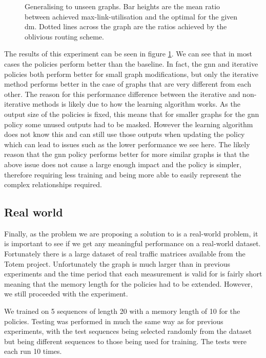 \begin{figure}
    \centering
    
    \caption{Generalising to unseen graphs. Bar heights are the mean ratio between achieved max-link-utilisation and the optimal for the given \ac{dm}. Dotted lines across the graph are the ratios achieved by the oblivious routing scheme.}
    \label{fig:exp_graphs}
\end{figure}

The results of this experiment can be seen in figure \ref{fig:exp_graphs}. We can see that in most cases the policies perform better than the baseline. In fact, the \ac{gnn} and iterative policies both perform better for small graph modifications, but only the iterative method performs better in the case of graphs that are very different from each other. The reason for this performance difference between the iterative and non-iterative methods is likely due to how the learning algorithm works. As the output size of the policies is fixed, this means that for smaller graphs for the \ac{gnn} policy some unused outputs had to be masked. However the learning algorithm does not know this and can still use those outputs when updating the policy which can lead to issues such as the lower performance we see here. The likely reason that the \ac{gnn} policy performs better for more similar graphs is that the above issue does not cause a large enough impact and the policy is simpler, therefore requiring less training and being more able to easily represent the complex relationships required.

\subsection{Real world}
Finally, as the problem we are proposing a solution to is a real-world problem, it is important to see if we get any meaningful performance on a real-world dataset. Fortunately there is a large dataset of real traffic matrices available from the Totem\cite{uhlig2006providing} project. Unfortunately the graph is much larger than in previous experiments and the time period that each measurement is valid for is fairly short meaning that the memory length for the policies had to be extended. However, we still proceeded with the experiment.

We trained on 5 sequences of length 20 with a memory length of 10 for the policies. Testing was performed in much the same way as for previous experiments, with the test sequences being selected randomly from the dataset but being different sequences to those being used for training. The tests were each run 10 times.

